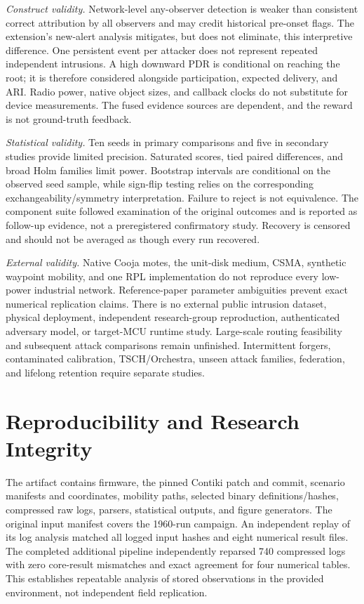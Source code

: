\textit{Construct validity.} Network-level any-observer detection is weaker than consistent correct attribution by all observers and may credit historical pre-onset flags. The extension's new-alert analysis mitigates, but does not eliminate, this interpretive difference. One persistent event per attacker does not represent repeated independent intrusions. A high downward PDR is conditional on reaching the root; it is therefore considered alongside participation, expected delivery, and ARI. Radio power, native object sizes, and callback clocks do not substitute for device measurements. The fused evidence sources are dependent, and the reward is not ground-truth feedback.

\textit{Statistical validity.} Ten seeds in primary comparisons and five in secondary studies provide limited precision. Saturated scores, tied paired differences, and broad Holm families limit power. Bootstrap intervals are conditional on the observed seed sample, while sign-flip testing relies on the corresponding exchangeability/symmetry interpretation. Failure to reject is not equivalence. The component suite followed examination of the original outcomes and is reported as follow-up evidence, not a preregistered confirmatory study. Recovery is censored and should not be averaged as though every run recovered.

\textit{External validity.} Native Cooja motes, the unit-disk medium, CSMA, synthetic waypoint mobility, and one RPL implementation do not reproduce every low-power industrial network. Reference-paper parameter ambiguities prevent exact numerical replication claims. There is no external public intrusion dataset, physical deployment, independent research-group reproduction, authenticated adversary model, or target-MCU runtime study. Large-scale routing feasibility and subsequent attack comparisons remain unfinished. Intermittent forgers, contaminated calibration, TSCH/Orchestra, unseen attack families, federation, and lifelong retention require separate studies.

\section{Reproducibility and Research Integrity}\label{sec:repro}
The artifact contains firmware, the pinned Contiki patch and commit, scenario manifests and coordinates, mobility paths, selected binary definitions/hashes, compressed raw logs, parsers, statistical outputs, and figure generators. The original input manifest covers the 1960-run campaign. An independent replay of its log analysis matched all logged input hashes and eight numerical result files. The completed additional pipeline independently reparsed 740 compressed logs with zero core-result mismatches and exact agreement for four numerical tables. This establishes repeatable analysis of stored observations in the provided environment, not independent field replication.

